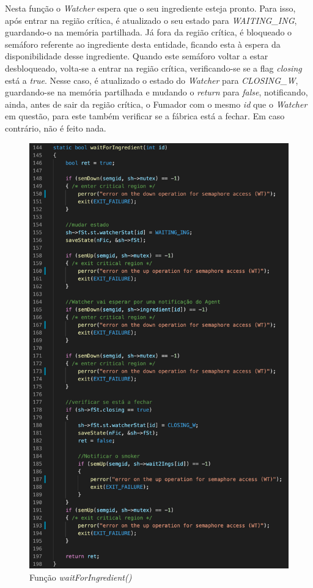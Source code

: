 \documentclass[10pt,portuguese]{article}
\begin{document}
\par Nesta função o \textit{Watcher} espera que o seu ingrediente esteja pronto. Para isso, após entrar na região crítica, é atualizado o seu estado para \textit{WAITING\_ING}, guardando-o na memória partilhada. Já fora da região crítica, é bloqueado o semáforo referente ao ingrediente desta entidade, ficando esta à espera da disponibilidade desse ingrediente. Quando este semáforo voltar a estar desbloqueado, volta-se a entrar na região crítica, verificando-se se a flag \textit{closing} está a \textit{true}. Nesse caso, é atualizado o estado do \textit{Watcher} para \textit{CLOSING\_W}, guardando-se na memória partilhada e mudando o \textit{return} para \textit{false}, notificando, ainda, antes de sair da região crítica, o Fumador com o mesmo \textit{id} que o \textit{Watcher} em questão, para este também verificar se a fábrica está a fechar. Em caso contrário, não é feito nada.

\begin{figure}[!h]
    \centering
    \includegraphics[scale=0.7]{images/implementation/waitforing.png}
    \caption{Função \textit{waitForIngredient()}}
\end{figure}
\end{document}
